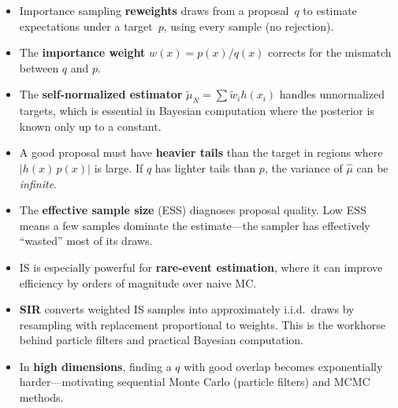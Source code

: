 \documentclass[11pt]{article}
\begin{document}
\begin{itemize}
  \item Importance sampling \textbf{reweights} draws from a proposal~$q$ to estimate expectations under a target~$p$, using every sample (no rejection).
  \item The \textbf{importance weight} $w(x) = p(x)/q(x)$ corrects for the mismatch between $q$ and $p$.
  \item The \textbf{self-normalized estimator} $\tilde{\mu}_N = \sum \tilde{w}_i h(x_i)$ handles unnormalized targets, which is essential in Bayesian computation where the posterior is known only up to a constant.
  \item A good proposal must have \textbf{heavier tails} than the target in regions where $|h(x)\,p(x)|$ is large.  If $q$ has lighter tails than $p$, the variance of $\hat{\mu}$ can be \emph{infinite}.
  \item The \textbf{effective sample size} (ESS) diagnoses proposal quality.  Low ESS means a few samples dominate the estimate---the sampler has effectively ``wasted'' most of its draws.
  \item IS is especially powerful for \textbf{rare-event estimation}, where it can improve efficiency by orders of magnitude over naive MC.
  \item \textbf{SIR} converts weighted IS samples into approximately i.i.d.\ draws by resampling with replacement proportional to weights.  This is the workhorse behind particle filters and practical Bayesian computation.
  \item In \textbf{high dimensions}, finding a $q$ with good overlap becomes exponentially harder---motivating sequential Monte Carlo (particle filters) and MCMC methods.
\end{itemize}
\end{document}
